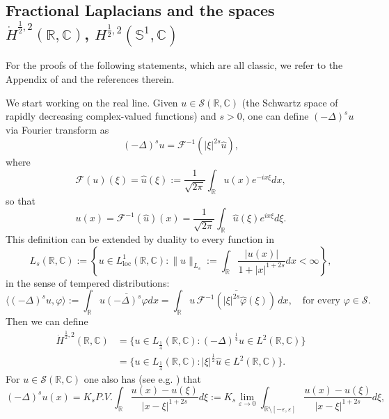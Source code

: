 \documentclass[12pt, a4paper]{article}
\newcommand{\M}[1]{\mathcal{#1}}
\newcommand{\sph}{\mathbb{S}}
\newcommand{\R}{\mathbb{R}}
\newcommand{\ve}{\varepsilon}
\renewcommand{\(}{\left(}
\renewcommand{\)}{\right)}
\DeclareMathOperator{\loc}{loc}
\begin{document}

\subsection{Fractional Laplacians and the spaces $\dot H^{\frac{1}{2},2}(\R,\mathbb{C})$, $H^{\frac{1}{2},2}(\sph^1,\mathbb{C})$}\label{a:fl}
For the proofs of the following statements, which are all classic, we refer to the Appendix of \cite{ManMar} and the references therein.

We start working on the real line.
Given $u\in \M{S}(\R,\mathbb{C})$ (the Schwartz space of rapidly decreasing complex-valued functions) and $s>0$, one can define $(-\Delta)^s u$ via Fourier transform as
\begin{equation}\label{Deltas}
(-\Delta)^s u =\M{F}^{-1}\(|\xi|^{2s}\hat u\),
\end{equation}
where
$$\M{F}(u)(\xi)=\hat u(\xi):=\frac{1}{\sqrt{2\pi}}\int_\R u(x)e^{-ix\xi}dx,$$
so that
$$u(x)=\M{F}^{-1}(\hat u)(x)=\frac{1}{\sqrt{2\pi}}\int_{\R} \hat u(\xi)e^{ix\xi}d\xi.$$
This definition can be extended by duality to every function in
$$L_s(\R,\mathbb{C}):=\left\{u\in L^1_{\loc}(\R,\mathbb{C}):\|u\|_{L_s}:=\int_{\R}\frac{|u(x)|}{1+|x|^{1+2s}}dx<\infty   \right\}, $$
in the sense of tempered distributions:
\begin{equation}\label{fraclapl2}
\langle (-\Delta)^s u,\varphi\rangle :=\int_{\R} u\overline{(-\Delta)^s \varphi} dx =\int_{\R}u\,\overline{\mathcal{F}^{-1}(|\xi|^{2s}\hat \varphi(\xi))}\,dx,\quad\text{for every }\varphi \in\mathcal{S}.
\end{equation}
Then we can define
\begin{equation}\label{defH12R}
\begin{split}
\dot H^{\frac{1}{2},2}(\R,\mathbb{C})&=\{u\in L_{\frac{1}{4}}(\R,\mathbb{C}): (-\Delta)^\frac14 u \in L^2(\R,\mathbb{C})\}\\
&=\{u\in L_{\frac{1}{4}}(\R,\mathbb{C}): |\xi|^\frac{1}{2} \hat u \in L^2(\R,\mathbb{C})\}.
\end{split}
\end{equation}
For $u\in\mathcal{S}(\R,\mathbb{C})$ one also has (see e.g. \cite[Section 3]{DPV})  that 
\begin{equation}\label{fraclapl}
(-\Delta)^s u(x)=K_s P.V.\int_{\R}\frac{u(x)-u(\xi)}{|x-\xi|^{1+2s}}d\xi:=K_s \lim_{\varepsilon\to 0}\int_{\R\setminus [-\ve,\ve]}\frac{u(x)-u(\xi)}{|x-\xi|^{1+2s}}d\xi,
\end{equation}
\end{document}
